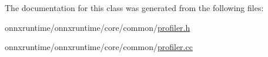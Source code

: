 The documentation for this class was generated from the following files\+:\begin{DoxyCompactItemize}
\item 
onnxruntime/onnxruntime/core/common/\mbox{\hyperlink{profiler_8h}{profiler.\+h}}\item 
onnxruntime/onnxruntime/core/common/\mbox{\hyperlink{profiler_8cc}{profiler.\+cc}}\end{DoxyCompactItemize}
